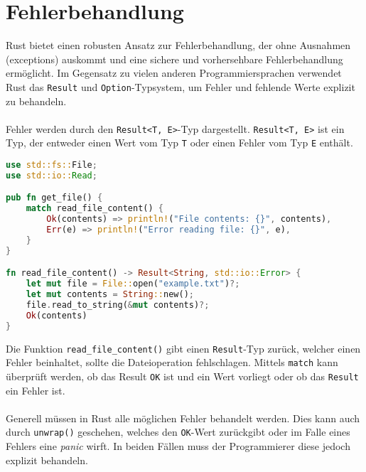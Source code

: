 \chapter{Fehlerbehandlung}
Rust bietet einen robusten Ansatz zur Fehlerbehandlung, der ohne Ausnahmen (\glspl{exception}) auskommt und eine sichere und vorhersehbare Fehlerbehandlung ermöglicht. 
Im Gegensatz zu vielen anderen Programmiersprachen verwendet Rust das \texttt{Result} und \texttt{Option}-Typsystem, um Fehler und fehlende Werte explizit zu behandeln.\\
\\
Fehler werden durch den \texttt{Result<T, E>}-Typ dargestellt. \texttt{Result<T, E>} ist ein Typ, der entweder einen Wert vom Typ \texttt{T} oder einen Fehler vom Typ \texttt{E} enthält.

\begin{lstlisting}[language=Rust, caption=Sichere Fehlerbehandlung]
use std::fs::File;
use std::io::Read;

pub fn get_file() {
    match read_file_content() {
        Ok(contents) => println!("File contents: {}", contents),
        Err(e) => println!("Error reading file: {}", e),
    }
}

fn read_file_content() -> Result<String, std::io::Error> {
    let mut file = File::open("example.txt")?;
    let mut contents = String::new();
    file.read_to_string(&mut contents)?;
    Ok(contents)
}
\end{lstlisting}
\noindent
Die Funktion \texttt{read\_file\_content()} gibt einen \texttt{Result}-Typ zurück, welcher einen Fehler beinhaltet, sollte die Dateioperation fehlschlagen. 
Mittels \texttt{match} kann überprüft werden, ob das Result \texttt{OK} ist und ein Wert vorliegt oder ob das \texttt{Result} ein Fehler ist.\\
\\
Generell müssen in Rust alle möglichen Fehler behandelt werden. 
Dies kann auch durch \texttt{unwrap()} geschehen, welches den \texttt{OK}-Wert zurückgibt oder im Falle eines Fehlers eine \textit{\gls{panic}} wirft. 
In beiden Fällen muss der Programmierer diese jedoch explizit behandeln.
